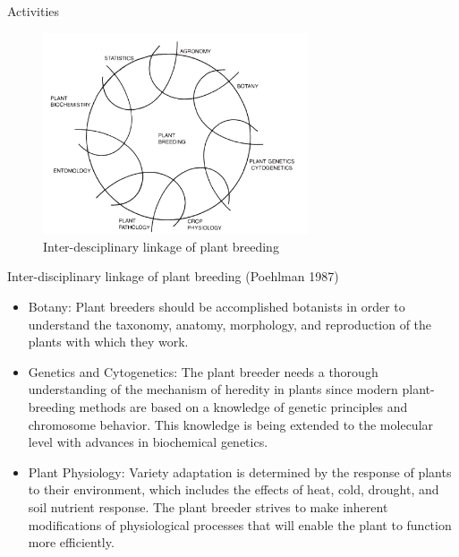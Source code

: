 \documentclass[11pt,ignorenonframetext,aspectratio=169]{beamer}
\begin{document}
\begin{frame}{Activities}
\protect\hypertarget{activities}{}
\begin{figure}
\includegraphics[width=0.7\textwidth,keepaspectratio,height=0.6\textheight]{./images/interdisciplinary_science} \caption{Inter-desciplinary linkage of plant breeding}\label{fig:plb-disciplines}
\end{figure}
\end{frame}

\begin{frame}{Inter-disciplinary linkage of plant breeding (Poehlman
1987)}
\protect\hypertarget{inter-disciplinary-linkage-of-plant-breeding-poehlman1987breeding}{}
\begin{itemize}
\item
  Botany: Plant breeders should be accomplished botanists in order to
  understand the taxonomy, anatomy, morphology, and reproduction of the
  plants with which they work.
\item
  Genetics and Cytogenetics: The plant breeder needs a thorough
  understanding of the mechanism of heredity in plants since modern
  plant-breeding methods are based on a knowledge of genetic principles
  and chromosome behavior. This knowledge is being extended to the
  molecular level with advances in biochemical genetics.
\item
  Plant Physiology: Variety adaptation is determined by the response of
  plants to their environment, which includes the effects of heat, cold,
  drought, and soil nutrient response. The plant breeder strives to make
  inherent modifications of physiological processes that will enable the
  plant to function more efficiently.
\end{itemize}
\end{frame}
\end{document}
